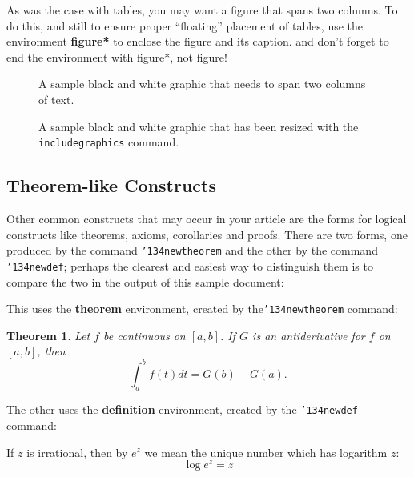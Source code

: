 \documentclass{sig-alternate-05-2015}
\begin{document}
As was the case with tables, you may want a figure
that spans two columns.  To do this, and still to
ensure proper ``floating'' placement of tables, use the environment
\textbf{figure*} to enclose the figure and its caption.
and don't forget to end the environment with
{figure*}, not {figure}!

\begin{figure*}
\centering
\caption{A sample black and white graphic
that needs to span two columns of text.}
\end{figure*}


\begin{figure}
\centering
\caption{A sample black and white graphic that has
been resized with the \texttt{includegraphics} command.}
\vskip -6pt
\end{figure}

\subsection{Theorem-like Constructs}
Other common constructs that may occur in your article are
the forms for logical constructs like theorems, axioms,
corollaries and proofs.  There are
two forms, one produced by the
command \texttt{{\char'134}newtheorem} and the
other by the command \texttt{{\char'134}newdef}; perhaps
the clearest and easiest way to distinguish them is
to compare the two in the output of this sample document:

This uses the \textbf{theorem} environment, created by
the\linebreak\texttt{{\char'134}newtheorem} command:
\newtheorem{theorem}{Theorem}
\begin{theorem}
Let $f$ be continuous on $[a,b]$.  If $G$ is
an antiderivative for $f$ on $[a,b]$, then
\begin{displaymath}\int^b_af(t)dt = G(b) - G(a).\end{displaymath}
\end{theorem}

The other uses the \textbf{definition} environment, created
by the \texttt{{\char'134}newdef} command:
\begin{definition}
If $z$ is irrational, then by $e^z$ we mean the
unique number which has
logarithm $z$: \begin{displaymath}{\log e^z = z}\end{displaymath}
\end{definition}
\end{document}
